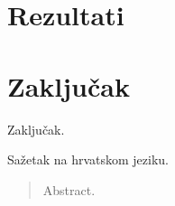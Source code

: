 \documentclass[utf8, diplomski, numeric]{fer}
\begin{document}
\chapter{Rezultati}







\chapter{Zaključak}
Zaključak.

\nocite{*}



\begin{sazetak}
Sažetak na hrvatskom jeziku.

\end{sazetak}

\begin{abstract}
Abstract.

\end{abstract}
\end{document}
